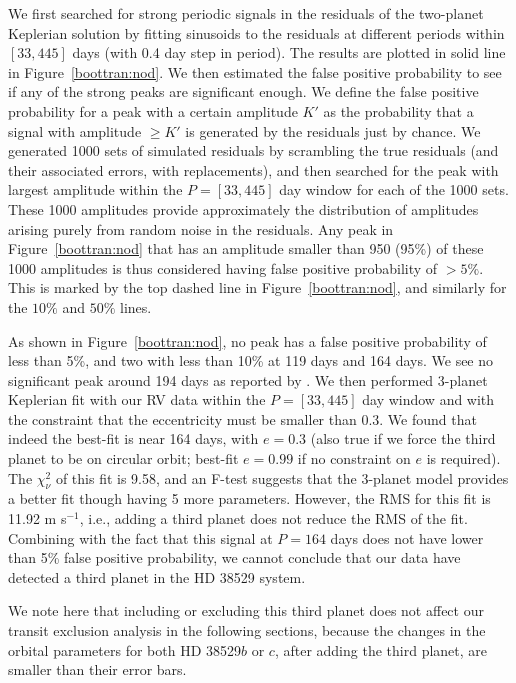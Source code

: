 We first searched for strong periodic signals in the residuals of the
two-planet Keplerian solution by fitting sinusoids to the residuals at
different periods within $[33,445]$ days (with 0.4 day step in
period). The results are plotted in solid line in Figure~\ref{boottran:nod}. We then
estimated the false positive probability to see if any of the strong
peaks are significant enough. We define the false positive probability
for a peak with a certain amplitude $K'$ as the probability that a
signal with amplitude $\geq K'$ is generated by the residuals just by
chance. We generated 1000 sets of simulated residuals by scrambling
the true residuals (and their associated errors, with replacements),
and then searched for the peak with largest amplitude within the
$P=[33,445]$ day window for each of the 1000 sets. These 1000
amplitudes provide approximately the distribution of amplitudes
arising purely from random noise in the residuals. Any peak in
Figure~\ref{boottran:nod} that has an amplitude smaller than 950 (95\%) of these 1000
amplitudes is thus considered having false positive probability of
$>5\%$. This is marked by the top dashed line in Figure~\ref{boottran:nod}, and
similarly for the $10\%$ and $50\%$ lines.

As shown in Figure~\ref{boottran:nod}, no peak has a false positive probability of less
than 5\%, and two with less than 10\% at 119 days and 164 days. We see
no significant peak around 194 days as reported by
\cite{2010AJ....139.1844B}. We then performed 3-planet Keplerian fit
with our RV data within the $P=[33,445]$ day window and with the
constraint that the eccentricity must be smaller than 0.3. We found
that indeed the best-fit is near 164 days, with $e=0.3$ (also true if
we force the third planet to be on circular orbit; best-fit $e=0.99$
if no constraint on $e$ is required). The $\chi_{\nu}^2$ of this fit
is 9.58, and an F-test suggests that the 3-planet model provides a
better fit though having 5 more parameters. However, the RMS for this
fit is 11.92 m s$^{-1}$, i.e., adding a third planet does not reduce
the RMS of the fit. Combining with the fact that this signal at
$P=164$ days does not have lower than 5\% false positive probability,
we cannot conclude that our data have detected a third planet in the
HD 38529 system.

We note here that including or excluding this third planet does not
affect our transit exclusion analysis in the following sections,
because the changes in the orbital parameters for both HD 38529$b$ or
$c$, after adding the third planet, are smaller than their error bars.



